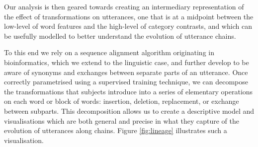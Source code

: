 \documentclass[english,]{article}
\begin{document}
Our analysis is then geared towards creating an intermediary representation of the effect of transformations on utterances, one that is at a midpoint between the low-level of word features and the high-level of category contrasts, and which can be usefully modelled to better understand the evolution of utterance chains.

To this end we rely on a sequence alignment algorithm originating in bioinformatics, which we extend to the linguistic case,
and further develop to be aware of synonyms and exchanges between separate parts of an utterance.
Once correctly parametrised using a supervised training technique, we can decompose the transformations that subjects introduce into a series of elementary operations on each word or block of words:
insertion, deletion, replacement, or exchange between subparts.
This decomposition allows us to create a descriptive model and visualisations which are both general and precise in what they capture of the evolution of utterances along chains. Figure \ref{fig:lineage} illustrates such a visualisation.
\end{document}
